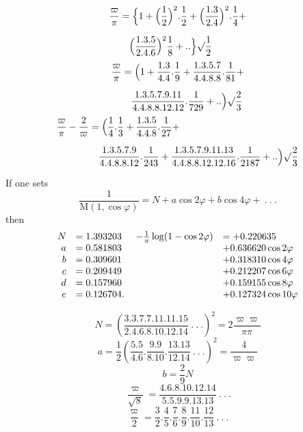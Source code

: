 \begingroup
\renewcommand{\arraystretch}{1.45}
\[
\begin{aligned}\frac{\varpi}{\pi}&=\Bigl\{1+\Bigl(\frac12\Bigr)^2.\frac12+
\Bigl(\frac{1.3}{2.4}\Bigr)^2.\frac14+
\\[7pt]&\quad{}\Bigl(\frac{1.3.5}{2.4.6}\Bigr)^2\frac18+..\Bigr\}\surd {\frac12}\end{aligned}
\]
\[
\begin{aligned}\frac{\varpi}{\pi}&=\Bigl(1+\frac{1.3}{4.4}.\frac19+
\frac{1.3.5.7}{4.4.8.8}.\frac1{81}+
\\[7pt]&\quad{}\frac{1.3.5.7.9.11}{4.4.8.8.12.12}.\frac1{729}+..\Bigr)\surd {\frac23}\end{aligned}
\]
\[
\begin{aligned}\frac{\varpi}{\pi}-\frac2{\varpi}&=\Bigl(\frac14.\frac13+\frac{1.3.5}{4.4.8}.\frac1{27}+
\\[7pt]&\quad{}\frac{1.3.5.7.9}{4.4.8.8.12}.\frac1{243}+
\frac{1.3.5.7.9.11.13}{4.4.8.8.12.12.16}.\frac1{2187}+..\Bigr)\surd {\frac23}\end{aligned}
\]

If one sets
\[
\frac1{\mathrm M(1,\cos\varphi)}=N+a\cos2\varphi+b\cos4\varphi+\ .\ .\ .
\]
then
\begingroup\small\[
\begin{array}{rl@{\hspace{12pt}}rl}
N&=1.393203&-\frac1\pi\log(1-\cos2\varphi)&=+0.220635\\
a&=0.581803&&+0.636620\cos2\varphi\\
b&=0.309601&&+0.318310\cos4\varphi\\
c&=0.209449&&+0.212207\cos6\varphi\\
d&=0.157960&&+0.159155\cos8\varphi\\
e&=0.126704.&&+0.127324\cos10\varphi
\end{array}
\]\endgroup


\[
N=\left(\frac{3.3.7.7.11.11.15}{2.4.6.8.10.12.14}\ .\ .\ .\right)^2
=2\frac{\varpi\varpi}{\pi\pi}
\]
\[
a=\frac12\left(\frac{5.5}{4.6}.\frac{9.9}{8.10}.\frac{13.13}{12.14}\ .\ .\ .\right)^2
=\frac4{\varpi\varpi}
\]
\[
b=\frac29N
\]
\[
\frac{\varpi}{\surd 8}=\frac{4.6.8.10.12.14}{5.5.9.9.13.13}\ .\ .\ .
\]
\[
\frac{\varpi}{2}=\frac32.\frac45.\frac76.\frac89.\frac{11}{10}.\frac{12}{13}\ .\ .\ .
\]

\clearpage
\endgroup
